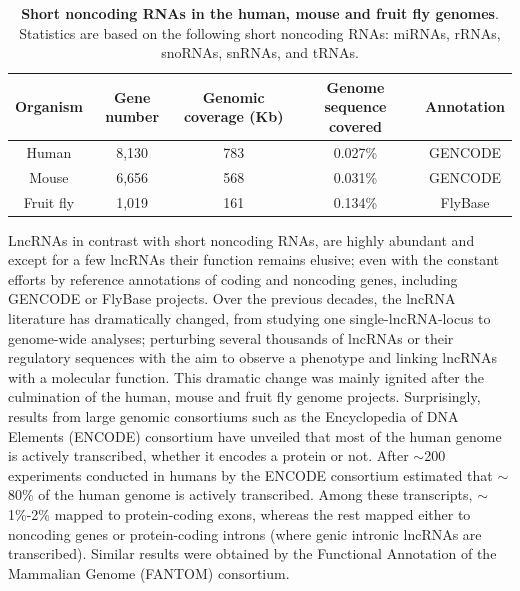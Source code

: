 \begin{table}[!htb]
  \caption[Short noncoding RNAs in the human, mouse and fruit fly genomes]{\textbf{Short noncoding RNAs in the human, mouse and fruit fly genomes}. Statistics are based on the following short noncoding RNAs: miRNAs, rRNAs, snoRNAs, snRNAs, and tRNAs.}
  \begin{scriptsize}
    \begin{tabulary}{0.65\linewidth}{ccccc}
      \textbf{Organism} & \textbf{Gene number} & \textbf{Genomic coverage (Kb)} & \textbf{Genome sequence covered} & \textbf{Annotation} \\ \hline
      Human & 8,130 & 783 & 0.027\% & GENCODE\autocite{frankish_2021_gencode} \\
      Mouse & 6,656 & 568 & 0.031\% & GENCODE\autocite{frankish_2021_gencode} \\
      Fruit fly & 1,019 & 161 & 0.134\% & FlyBase\autocite{thurmond_2019_flybase} \\
    \end{tabulary}
  \end{scriptsize}
  \label{tab:ncRNAs}
\end{table}

LncRNAs in contrast with short noncoding RNAs, are highly abundant and except for a few lncRNAs their function remains elusive; even with the constant efforts by reference annotations of coding and noncoding genes, including GENCODE\autocite{frankish_2021_gencode} or FlyBase\autocite{thurmond_2019_flybase} projects. Over the previous decades, the lncRNA literature has dramatically changed, from studying one single-lncRNA-locus to genome-wide analyses; perturbing several thousands of lncRNAs or their regulatory sequences with the aim to observe a phenotype and linking lncRNAs with a molecular function. This dramatic change was mainly ignited after the culmination of the human, mouse and fruit fly genome projects. Surprisingly, results from large genomic consortiums such as the Encyclopedia of DNA Elements (ENCODE) consortium have unveiled that most of the human genome is actively transcribed, whether it encodes a protein or not.\autocite{encode_2004,rao_2017_lncRNA_biology} After $\sim$200 experiments conducted in humans by the ENCODE consortium estimated that $\sim$80\% of the human genome is actively transcribed. Among these transcripts, $\sim$1\%-2\% mapped to protein-coding exons, whereas the rest mapped either to noncoding genes or protein-coding introns (where genic intronic lncRNAs are transcribed).\autocite{encode_2004,rao_2017_lncRNA_biology,djebali_2012_landscape} Similar results were obtained by the Functional Annotation of the Mammalian Genome (FANTOM) consortium.\autocite{hon_2017_fantom_cat}

